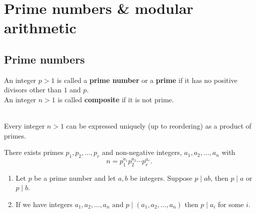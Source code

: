 \documentclass[12pt, a4paper]{article}
\begin{document}


\section{Prime numbers \& modular arithmetic}

\subsection{Prime numbers}

\begin{definition}
    An integer \(p>1\) is called a \textbf{prime number} or a \textbf{prime} if it has no positive divisors other than \(1\) and \(p\). \\ An integer \(n>1\) is called \textbf{composite} if it is not prime.
\end{definition}

\begin{theorem}
    \hphantom{wahoo} \\
    Every integer \(n>1\) can be expressed uniquely (up to reordering) as a product of primes.
\end{theorem}

\begin{corollary}
    There exists primes \(p_1,p_2,\ldots, p_r\) and non-negative integers, \(a_1,a_2,\ldots,a_n\) with 
    \[n=p_1^{a_1}p_2^{a_2}\cdots p_r^{a_r}.\]
\end{corollary}

\begin{lemma}
    \hphantom{wahoo}
    \begin{enumerate}
        \item Let \(p\) be a prime number and let \(a,b\) be integers. Suppose \(p\mid ab\), then \(p\mid a\) or \(p\mid b\).
        \item If we have integers \(a_1,a_2,\dots,a_n\) and \(p\mid (a_1,a_2,\dots,a_n)\) then \(p\mid a_i\) for some \(i\).
    \end{enumerate}
\end{lemma}
\end{document}
